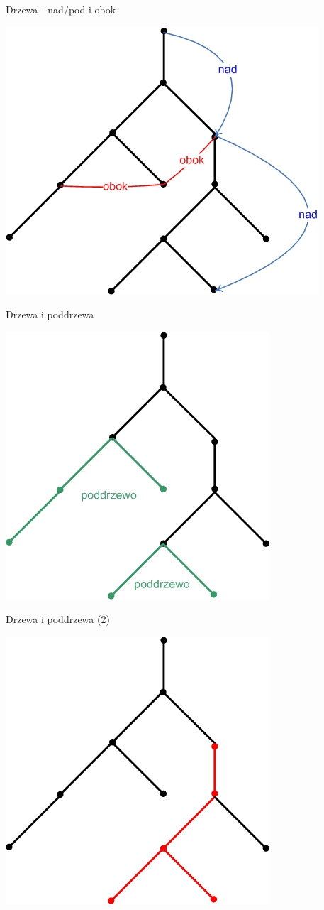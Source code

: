 \documentclass{beamer}
\begin{document}
\begin{frame}{Drzewa - nad/pod i obok}
\begin{center}
\includegraphics[width=7 cm]{../pliki_wlasne/drzewo7.jpg}
\end{center}
\end{frame}

\begin{frame}{Drzewa i poddrzewa}
\begin{center}
\includegraphics[width=7 cm]{../pliki_wlasne/drzewo8.jpg}
\end{center}
\end{frame}

\begin{frame}{Drzewa i poddrzewa (2)}
\begin{center}
\includegraphics[width=7 cm]{../pliki_wlasne/drzewo9.jpg}
\end{center}
\end{frame}
\end{document}
